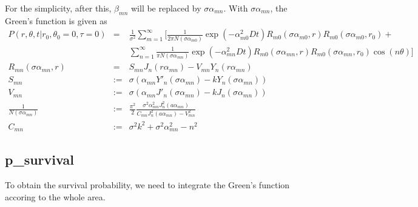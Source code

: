 \documentclass{article}
\begin{document}
For the simplicity, after this, $\beta_{mn}$ will be replaced by $\sigma\alpha_{mn}$.
With $\sigma\alpha_{mn}$, the Green's function is given as
\begin{eqnarray}
    P(r, \theta, t | r_0, \theta_0 = 0, \tau = 0) &=& \frac{1}{\sigma^2}
    \sum_{m=1}^{\infty}\Bigg[
        \frac{1}{2\pi N(\sigma\alpha_{m0})} \exp(-\alpha_{m0}^2Dt)
        R_{m0}(\sigma\alpha_{m0}, r) R_{m0}(\sigma\alpha_{m0}, r_0) +
        \nonumber\\
        & &\sum_{n=1}^{\infty} \frac{1}{\pi N(\sigma\alpha_{mn})}
        \exp(-\alpha_{mn}^2Dt)
        R_{m0}(\sigma\alpha_{mn}, r) R_{m0}(\sigma\alpha_{mn}, r_0)\cos(n\theta) \Bigg] \\
    R_{mn}(\sigma\alpha_{mn}, r) &=&
        S_{mn}J_n(r\alpha_{mn}) -
        V_{mn}Y_n(r\alpha_{mn}) \\
    S_{mn} &:=& \sigma(\alpha_{mn}Y'_n(\sigma\alpha_{mn}) - kY_n(\sigma\alpha_{mn})) \\
    V_{mn} &:=& \sigma(\alpha_{mn}J'_n(\sigma\alpha_{mn}) - kJ_n(\sigma\alpha_{mn})) \\
    \frac{1}{N(\sigma\alpha_{mn})} &:=& \frac{\pi^2}{2}
        \frac{\sigma^2\alpha_{mn}^2 J^2_n(a\alpha_{mn})}
             {C_{mn} J_n^2(a\alpha_{mn}) - V_{mn}^2} \\
    C_{mn} &:=& \sigma^2k^2 + \sigma^2\alpha_{mn}^2 - n^2
\end{eqnarray}

\subsection{p\_survival}

To obtain the survival probability, we need to integrate the Green's function
accoring to the whole area.
\end{document}
